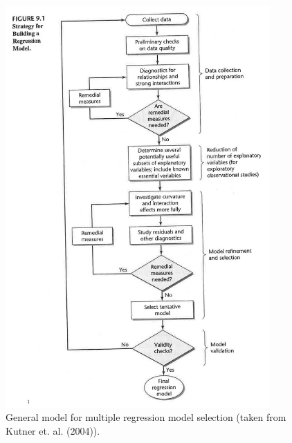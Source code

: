 \documentclass[12pt]{../notes}
\begin{document}
\begin{figure}
\centering
\includegraphics[width=0.9\textwidth]{../figures/module3/workflow.jpg}
\caption{General model for multiple regression model selection (taken from Kutner et. al. (2004)).}
\label{fig:workflow}
\end{figure}

\end{document}
